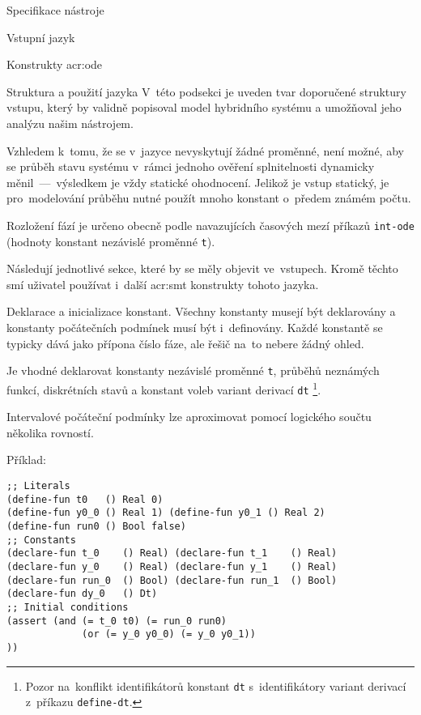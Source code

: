 \documentclass[thesis=M,czech]{FITthesis}[2012/06/26]
\newcommand{\acrlabel}[1]{acr:#1}
\newcommand{\acr}[1]{\acrshort{\acrlabel{#1}}}
\newcommand{\id}[1]{\texttt{#1}}
\begin{document}
\begin{section}{Specifikace nástroje}
\begin{subsection}{Vstupní jazyk}
\begin{subsubsection}{Konstrukty \acr{ode}}

\end{subsubsection} %


\begin{subsubsection}{Struktura a použití jazyka}
\label{sss:design:spec:ilang:struct}
V~této podsekci je uveden tvar doporučené struktury vstupu,
který by validně popisoval model hybridního systému
a umožňoval jeho analýzu našim nástrojem.

Vzhledem k~tomu, že se v~jazyce nevyskytují žádné proměnné,
není možné, aby se průběh stavu systému
v~rámci jednoho ověření splnitelnosti
dynamicky měnil~---~výsledkem je vždy statické ohodnocení.
Jelikož je vstup statický,
je pro~modelování průběhu nutné použít mnoho konstant
o~předem známém počtu.

Rozložení fází je určeno obecně
podle navazujících časových mezí příkazů \id{int-ode}
(hodnoty konstant nezávislé proměnné \id{t}).

Následují jednotlivé sekce,
které by se měly objevit ve~vstupech.
Kromě těchto smí uživatel používat
i~další \acr{smt} konstrukty tohoto jazyka.


\begin{paragraph}{Deklarace a inicializace konstant.}
\label{p:design:spec:ilang:struct:const}
Všechny konstanty musejí být deklarovány a konstanty
počátečních podmínek
musí být i~definovány.
Každé konstantě se typicky dává jako přípona číslo fáze,
ale řešič na~to nebere žádný ohled.

Je vhodné deklarovat konstanty
nezávislé proměnné \id{t},
průběhů neznámých funkcí, diskrétních stavů
a konstant voleb variant derivací \id{dt}%
\footnote{Pozor na~konflikt identifikátorů konstant \id{dt}
s~identifikátory variant derivací
z~příkazu \id{define\--dt}.}.

Intervalové počáteční podmínky lze aproximovat
pomocí logického součtu několika rovností.

Příklad:
\begin{Verbatim}[samepage=true]
;; Literals
(define-fun t0   () Real 0)
(define-fun y0_0 () Real 1) (define-fun y0_1 () Real 2)
(define-fun run0 () Bool false)
;; Constants
(declare-fun t_0    () Real) (declare-fun t_1    () Real)
(declare-fun y_0    () Real) (declare-fun y_1    () Real)
(declare-fun run_0  () Bool) (declare-fun run_1  () Bool)
(declare-fun dy_0   () Dt)
;; Initial conditions
(assert (and (= t_0 t0) (= run_0 run0)
             (or (= y_0 y0_0) (= y_0 y0_1))
))
\end{Verbatim}
\end{paragraph} %


\end{subsubsection}
\end{subsection}
\end{section}
\end{document}
